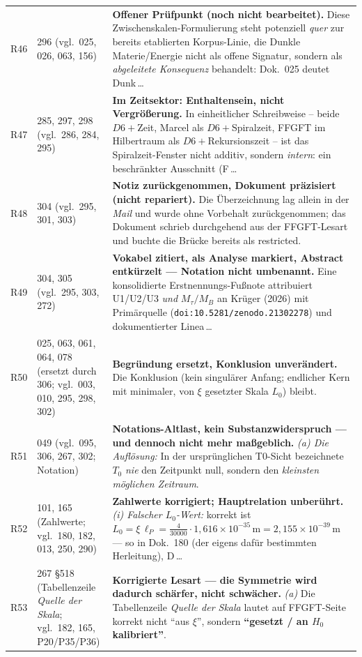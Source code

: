 \begin{longtable}{@{}p{0.9cm}p{3.1cm}p{10.2cm}@{}}
R46 & 296 (vgl.\ 025, 026, 063, 156) & \textbf{Offener Prüfpunkt (noch nicht bearbeitet).} Diese Zwischenskalen-Formulierung steht potenziell \emph{quer} zur bereits etablierten Korpus-Linie, die Dunkle Materie/Energie nicht als offene Signatur, sondern als \emph{abgeleitete Konsequenz} behandelt: Dok.~025 deutet Dunk\,\ldots \\
R47 & 285, 297, 298 (vgl.\ 286, 284, 295) & \textbf{Im Zeitsektor: Enthaltensein, nicht Vergrößerung.} In einheitlicher Schreibweise -- beide $D6+$Zeit, Marcel als $D6+$Spiralzeit, FFGFT im Hilbertraum als $D6+$Rekursionszeit -- ist das Spiralzeit-Fenster nicht additiv, sondern \emph{intern}: ein beschränkter Ausschnitt (F\,\ldots \\
R48 & 304 (vgl.\ 295, 301, 303) & \textbf{Notiz zurückgenommen, Dokument präzisiert (nicht repariert).} Die Überzeichnung lag allein in der \emph{Mail} und wurde ohne Vorbehalt zurückgenommen; das Dokument schrieb durchgehend aus der FFGFT-Lesart und buchte die Brücke bereits als restricted. \\
R49 & 304, 305 (vgl.\ 295, 303, 272) & \textbf{Vokabel zitiert, als Analyse markiert, Abstract entkürzelt --- Notation nicht umbenannt.} Eine konsolidierte Erstnennungs-Fußnote attribuiert U1/U2/U3 \emph{und} $M_\tau/M_B$ an Krüger (2026) mit Primärquelle (\texttt{doi:10.5281/zenodo.21302278}) und dokumentierter Linea\,\ldots \\
R50 & 025, 063, 061, 064, 078 (ersetzt durch 306; vgl.\ 003, 010, 295, 298, 302) & \textbf{Begründung ersetzt, Konklusion unverändert.} Die Konklusion (kein singulärer Anfang; endlicher Kern mit minimaler, von $\xi$ gesetzter Skala $L_0$) bleibt. \\
R51 & 049 (vgl.\ 095, 306, 267, 302; Notation) & \textbf{Notations-Altlast, kein Substanzwiderspruch --- und dennoch nicht mehr maßgeblich.} \emph{(a) Die Auflösung:} In der ursprünglichen T0-Sicht bezeichnete $T_0$ \emph{nie} den Zeitpunkt null, sondern den \emph{kleinsten möglichen Zeitraum}. \\
R52 & 101, 165 (Zahlwerte; vgl.\ 180, 182, 013, 250, 290) & \textbf{Zahlwerte korrigiert; Hauptrelation unberührt.} \emph{(i) Falscher $L_0$-Wert:} korrekt ist $L_0 = \xi\,\ell_P = \tfrac{4}{30000}\cdot 1{,}616\times10^{-35}\,\text{m} = \boxed{2{,}155\times10^{-39}\,\text{m}}$ --- so in Dok.~180 (der eigens dafür bestimmten Herleitung), D\,\ldots \\
R53 & 267 \S518 (Tabellenzeile \emph{Quelle der Skala}; vgl.\ 182, 165, P20/P35/P36) & \textbf{Korrigierte Lesart --- die Symmetrie wird dadurch schärfer, nicht schwächer.} \emph{(a)} Die Tabellenzeile \emph{Quelle der Skala} lautet auf FFGFT-Seite korrekt nicht \enquote{aus $\xi$}, sondern \textbf{\enquote{gesetzt / an $H_0$ kalibriert}}. \\

\end{longtable}
